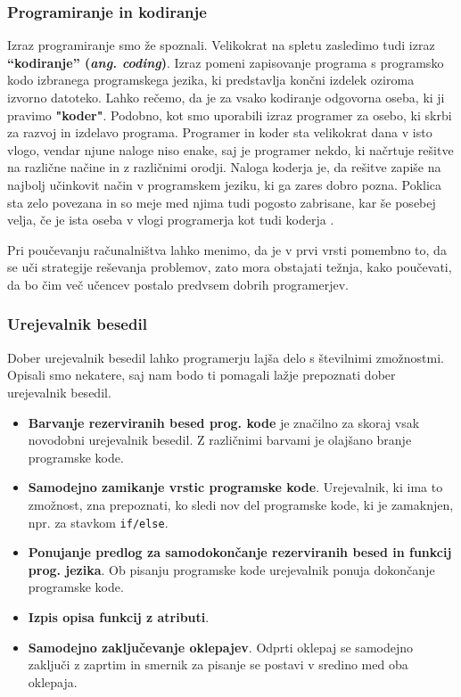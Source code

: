 \subsubsection{Programiranje in kodiranje}
\label{sec:programiranje_kodiranje}

Izraz programiranje smo že spoznali. Velikokrat na spletu zasledimo
tudi izraz \textbf{``kodiranje'' (\emph{ang. coding})}. Izraz pomeni
zapisovanje programa s programsko kodo izbranega programskega jezika,
ki predstavlja končni izdelek oziroma izvorno datoteko. Lahko rečemo,
da je za vsako kodiranje odgovorna oseba, ki ji pravimo
\textbf{"koder"}. Podobno, kot smo uporabili izraz programer za osebo,
ki skrbi za razvoj in izdelavo programa. Programer in koder sta velikokrat dana v isto vlogo, vendar njune naloge niso enake, saj je
programer nekdo, ki načrtuje rešitve na različne načine in z
različnimi orodji. Naloga koderja je, da rešitve zapiše na najbolj
učinkovit način v programskem jeziku, ki ga zares dobro
pozna. Poklica sta zelo povezana in so meje med njima
tudi pogosto zabrisane, kar še posebej velja, če je ista oseba v vlogi
programerja kot tudi koderja \cite{web:coder}.

Pri poučevanju računalništva lahko menimo, da je v prvi vrsti pomembno to, da se
uči strategije reševanja problemov, zato mora obstajati težnja, kako poučevati,
da bo čim več učencev postalo predvsem dobrih programerjev.

\subsubsection{Urejevalnik besedil}
\label{sec:urejevalnik_besedil}

Dober urejevalnik besedil lahko programerju lajša delo s številnimi
zmožnostmi. Opisali smo nekatere, saj nam bodo ti pomagali lažje
prepoznati dober urejevalnik besedil.


\begin{itemize}
\item \textbf{Barvanje rezerviranih besed prog. kode} je značilno za
  skoraj vsak novodobni urejevalnik besedil. Z različnimi barvami je
  olajšano branje programske kode.
\item \textbf{Samodejno zamikanje vrstic programske
    kode}. Urejevalnik, ki ima to zmožnost, zna prepoznati, ko sledi
  nov del programske kode, ki je zamaknjen, npr. za stavkom
  \texttt{if/else}.
\item \textbf{Ponujanje predlog za samodokončanje rezerviranih
    besed in funkcij prog. jezika}. Ob pisanju programske kode
  urejevalnik ponuja dokončanje programske kode.
\item \textbf{Izpis opisa funkcij z atributi}. 
\item \textbf{Samodejno zaključevanje oklepajev}. Odprti oklepaj se
  samodejno zaključi z zaprtim in smernik za pisanje se postavi v
  sredino med oba oklepaja. 
\end{itemize}

